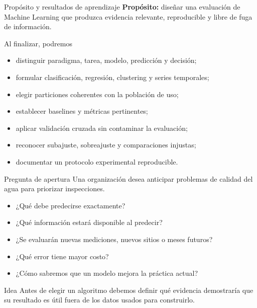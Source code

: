 \documentclass[aspectratio=169,10pt]{beamer}
\begin{document}
\begin{frame}{Propósito y resultados de aprendizaje}
  \footnotesize
  \textbf{Propósito:} diseñar una evaluación de Machine Learning que produzca evidencia relevante, reproducible y libre de fuga de información.
  \begin{block}{Al finalizar, podremos}
    \begin{itemize}
      \item distinguir paradigma, tarea, modelo, predicción y decisión;
      \item formular clasificación, regresión, clustering y series temporales;
      \item elegir particiones coherentes con la población de uso;
      \item establecer baselines y métricas pertinentes;
      \item aplicar validación cruzada sin contaminar la evaluación;
      \item reconocer subajuste, sobreajuste y comparaciones injustas;
      \item documentar un protocolo experimental reproducible.
    \end{itemize}
  \end{block}
\end{frame}

\begin{frame}{Pregunta de apertura}
  \small
  Una organización desea anticipar problemas de calidad del agua para priorizar inspecciones.
  \begin{itemize}
    \item ¿Qué debe predecirse exactamente?
    \item ¿Qué información estará disponible al predecir?
    \item ¿Se evaluarán nuevas mediciones, nuevos sitios o meses futuros?
    \item ¿Qué error tiene mayor costo?
    \item ¿Cómo sabremos que un modelo mejora la práctica actual?
  \end{itemize}
  \begin{block}{Idea}
    Antes de elegir un algoritmo debemos definir qué evidencia demostraría que su resultado es útil fuera de los datos usados para construirlo.
  \end{block}
\end{frame}
\end{document}
